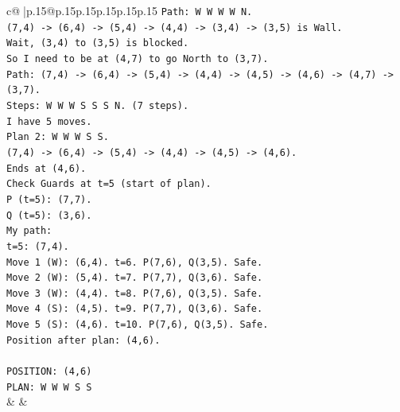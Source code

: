 \documentclass{article}
\begin{document}
{\begin{supertabular}{c@{$\;$}|p{.15\linewidth}@{}p{.15\linewidth}p{.15\linewidth}p{.15\linewidth}p{.15\linewidth}p{.15\linewidth}}
{{{\texttt{Path: W W W W N.} \\
\texttt{(7,4) {-}> (6,4) {-}> (5,4) {-}> (4,4) {-}> (3,4) {-}> (3,5) is Wall.} \\
\texttt{Wait, (3,4) to (3,5) is blocked.} \\
\texttt{So I need to be at (4,7) to go North to (3,7).} \\
\texttt{Path: (7,4) {-}> (6,4) {-}> (5,4) {-}> (4,4) {-}> (4,5) {-}> (4,6) {-}> (4,7) {-}> (3,7).} \\
\texttt{Steps: W W W S S S N. (7 steps).} \\
\texttt{I have 5 moves.} \\
\texttt{Plan 2: W W W S S.} \\
\texttt{(7,4) {-}> (6,4) {-}> (5,4) {-}> (4,4) {-}> (4,5) {-}> (4,6).} \\
\texttt{Ends at (4,6).} \\
\texttt{Check Guards at t=5 (start of plan).} \\
\texttt{P (t=5): (7,7).} \\
\texttt{Q (t=5): (3,6).} \\
\texttt{My path:} \\
\texttt{t=5: (7,4).} \\
\texttt{Move 1 (W): (6,4). t=6. P(7,6), Q(3,5). Safe.} \\
\texttt{Move 2 (W): (5,4). t=7. P(7,7), Q(3,6). Safe.} \\
\texttt{Move 3 (W): (4,4). t=8. P(7,6), Q(3,5). Safe.} \\
\texttt{Move 4 (S): (4,5). t=9. P(7,7), Q(3,6). Safe.} \\
\texttt{Move 5 (S): (4,6). t=10. P(7,6), Q(3,5). Safe.} \\
\texttt{Position after plan: (4,6).} \\
\\ 
\texttt{POSITION: (4,6)} \\
\texttt{PLAN: W W W S S} \\
            }
        }
    }
    & & \\ \\


\end{supertabular}}
\end{document}
